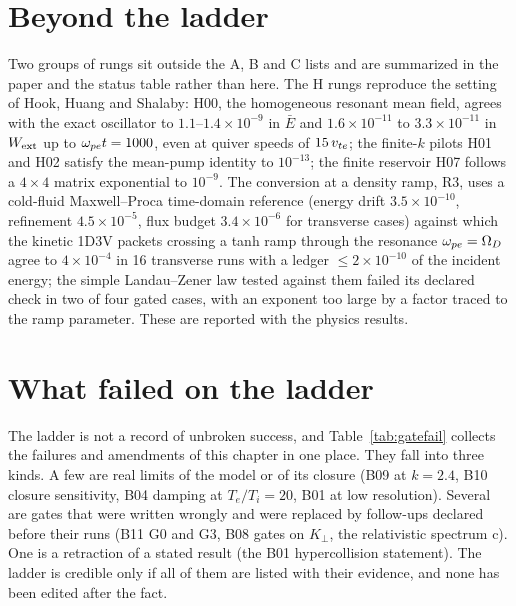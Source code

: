 \section{Beyond the ladder}\label{sec:beyond}

Two groups of rungs sit outside the A, B and C lists and are summarized in the paper and the status table rather than here. The H rungs reproduce the setting of Hook, Huang and Shalaby: H00, the homogeneous resonant mean field, agrees with the exact oscillator to $1.1$--$1.4\times10^{-9}$ in $\bar E$ and $1.6\times10^{-11}$ to $3.3\times10^{-11}$ in $W_{\rm ext}$ up to $\omega_{pe} t=1000$, even at quiver speeds of $15\,v_{te}$; the finite-$k$ pilots H01 and H02 satisfy the mean-pump identity to $10^{-13}$; the finite reservoir H07 follows a $4\times4$ matrix exponential to $10^{-9}$. The conversion at a density ramp, R3, uses a cold-fluid Maxwell--Proca time-domain reference (energy drift $3.5\times10^{-10}$, refinement $4.5\times10^{-5}$, flux budget $3.4\times10^{-6}$ for transverse cases) against which the kinetic 1D3V packets crossing a tanh ramp through the resonance $\omega_{pe}=\Omega_D$ agree to $4\times10^{-4}$ in 16 transverse runs with a ledger $\le2\times10^{-10}$ of the incident energy; the simple Landau--Zener law tested against them failed its declared check in two of four gated cases, with an exponent too large by a factor traced to the ramp parameter. These are reported with the physics results.

\section{What failed on the ladder}\label{sec:failed-ladder}

The ladder is not a record of unbroken success, and Table~\ref{tab:gatefail} collects the failures and amendments of this chapter in one place. They fall into three kinds. A few are real limits of the model or of its closure (B09 at $k=2.4$, B10 closure sensitivity, B04 damping at $T_e/T_i=20$, B01 at low resolution). Several are gates that were written wrongly and were replaced by follow-ups declared before their runs (B11 G0 and G3, B08 gates on $K_\perp$, the relativistic spectrum c). One is a retraction of a stated result (the B01 hypercollision statement). The ladder is credible only if all of them are listed with their evidence, and none has been edited after the fact.

